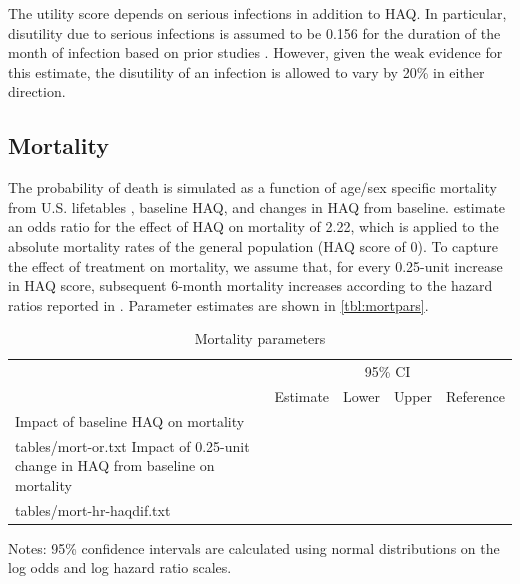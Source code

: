 \documentclass[11pt,final,fleqn]{article}\usepackage[]{graphicx}\usepackage[]{color}
\makeatletter
\theoremstyle{plain}
\newcommand*\ExpandableInput[1]{\@@input#1 }
\makeatother
\begin{document}
The utility score depends on serious infections in addition to HAQ. In particular, disutility due to serious infections is assumed to be 0.156 for the duration of the month of infection based on prior studies \citep{stevenson2016adalimumab, oppong2013impact}. However, given the weak evidence for this estimate, the disutility of an infection is allowed to vary by 20\% in either direction. 

\subsection{Mortality}
The probability of death is simulated as a function of age/sex specific mortality from U.S. lifetables \citep{arias2015united}, baseline HAQ, and changes in HAQ from baseline. \citet{wolfe2003predicting} estimate an odds ratio for the effect of HAQ on mortality of 2.22, which is applied to the absolute mortality rates of the general population (HAQ score of 0). To capture the effect of treatment on mortality, we assume that, for every 0.25-unit increase in HAQ score, subsequent 6-month mortality increases according to the hazard ratios reported in \citet{michaud2012mortality}. Parameter estimates are shown in \autoref{tbl:mortpars}.



\begin{table}[!ht]
\begin{center}
\begin{threeparttable}
\caption{Mortality parameters} \label{tbl:mortpars}
\footnotesize
\begin{tabularx}{\textwidth}{@{\extracolsep{\fill}}lcccc}
\hline
\multicolumn{2}{l}{} & \multicolumn{2}{c}{95\% CI} & \multicolumn{1}{l}{} \\
\cmidrule{3-4} 
\multicolumn{1}{l}{} & \multicolumn{1}{l}{Estimate} & \multicolumn{1}{c}{Lower} & \multicolumn{1}{c}{Upper} & \multicolumn{1}{c}{Reference} \\
\hline
Impact of baseline HAQ on mortality \\
\ExpandableInput{tables/mort-or.txt}
Impact of 0.25-unit change in HAQ from baseline on mortality\\
\ExpandableInput{tables/mort-hr-haqdif.txt}
\hline
\end{tabularx}
\scriptsize
Notes: 95\% confidence intervals are calculated using normal distributions on the log odds
and log hazard ratio scales. 
\end{threeparttable}
\end{center}
\end{table}
\end{document}
